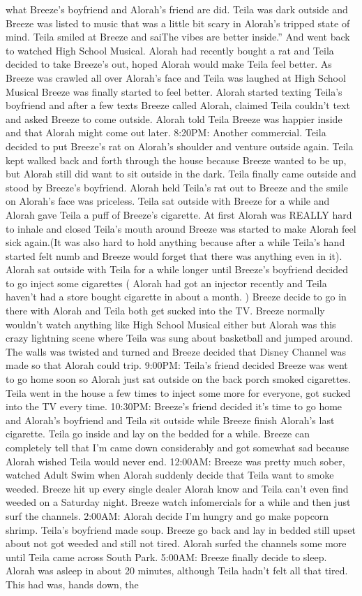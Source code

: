 \documentclass[12pt]{book}
\begin{document}
what Breeze's boyfriend and Alorah's friend are did. Teila was dark outside and Breeze was listed to music that was a little bit scary in Alorah's tripped state of mind. Teila smiled at Breeze and saiThe vibes are better inside.'' And went back to watched High School Musical. Alorah had recently bought a rat and Teila decided to take Breeze's out, hoped Alorah would make Teila feel better. As Breeze was crawled all over Alorah's face and Teila was laughed at High School Musical Breeze was finally started to feel better. Alorah started texting Teila's boyfriend and after a few texts Breeze called Alorah, claimed Teila couldn't text and asked Breeze to come outside. Alorah told Teila Breeze was happier inside and that Alorah might come out later. 8:20PM: Another commercial. Teila decided to put Breeze's rat on Alorah's shoulder and venture outside again. Teila kept walked back and forth through the house because Breeze wanted to be up, but Alorah still did want to sit outside in the dark. Teila finally came outside and stood by Breeze's boyfriend. Alorah held Teila's rat out to Breeze and the smile on Alorah's face was priceless. Teila sat outside with Breeze for a while and Alorah gave Teila a puff of Breeze's cigarette. At first Alorah was REALLY hard to inhale and closed Teila's mouth around Breeze was started to make Alorah feel sick again.(It was also hard to hold anything because after a while Teila's hand started felt numb and Breeze would forget that there was anything even in it). Alorah sat outside with Teila for a while longer until Breeze's boyfriend decided to go inject some cigarettes ( Alorah had got an injector recently and Teila haven't had a store bought cigarette in about a month. ) Breeze decide to go in there with Alorah and Teila both get sucked into the TV. Breeze normally wouldn't watch anything like High School Musical either but Alorah was this crazy lightning scene where Teila was sung about basketball and jumped around. The walls was twisted and turned and Breeze decided that Disney Channel was made so that Alorah could trip. 9:00PM: Teila's friend decided Breeze was went to go home soon so Alorah just sat outside on the back porch smoked cigarettes. Teila went in the house a few times to inject some more for everyone, got sucked into the TV every time. 10:30PM: Breeze's friend decided it's time to go home and Alorah's boyfriend and Teila sit outside while Breeze finish Alorah's last cigarette. Teila go inside and lay on the bedded for a while. Breeze can completely tell that I'm came down considerably and got somewhat sad because Alorah wished Teila would never end. 12:00AM: Breeze was pretty much sober, watched Adult Swim when Alorah suddenly decide that Teila want to smoke weeded. Breeze hit up every single dealer Alorah know and Teila can't even find weeded on a Saturday night. Breeze watch infomercials for a while and then just surf the channels. 2:00AM: Alorah decide I'm hungry and go make popcorn shrimp. Teila's boyfriend made soup. Breeze go back and lay in bedded still upset about not got weeded and still not tired. Alorah surfed the channels some more until Teila came across South Park. 5:00AM: Breeze finally decide to sleep. Alorah was asleep in about 20 minutes, although Teila hadn't felt all that tired. This had was, hands down, the 
\end{document}
